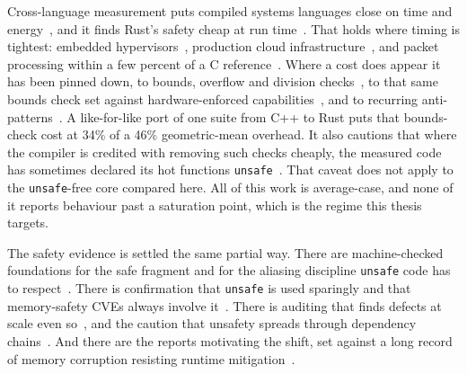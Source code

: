 \documentclass[english,oneside,a4paper,censored,csm,software-track-2020]{HYthesisML}
\begin{document}
Cross-language measurement puts compiled systems languages close on time and
energy~\cite{bugden2022rust,pereira2017energy}, and it finds Rust's safety cheap at run
time~\cite{balasubramanian2017rust,levy2017kernel}. That holds where timing is tightest: embedded
hypervisors~\cite{mo2023rustshyper}, production cloud infrastructure~\cite{agache2020firecracker},
and packet processing within a few percent of a C
reference~\cite{emmerich2019drivers,xiao2024rpkt}. Where a cost does appear it has been pinned
down, to bounds, overflow and division checks~\cite{zhang2022runtime}, to that same bounds check
set against hardware-enforced capabilities~\cite{harris2023morello}, and to recurring
anti-patterns~\cite{cui2025perfbugs}. A like-for-like port of one suite from C++ to Rust puts that
bounds-check cost at 34\% of a 46\% geometric-mean overhead. It also cautions that where the
compiler is credited with removing such checks cheaply, the measured code has sometimes declared
its hot functions \texttt{unsafe}~\cite{naylor2026cherisimt}. That caveat does not apply to the
\texttt{unsafe}-free core compared here. All of this work is average-case, and none of it reports
behaviour past a saturation point, which is the regime this thesis targets.

The safety evidence is settled the same partial way. There are machine-checked foundations for the
safe fragment and for the aliasing discipline \texttt{unsafe} code has to
respect~\cite{jung2018rustbelt,jung2021safe,jung2020stacked}. There is confirmation that
\texttt{unsafe} is used sparingly and that memory-safety CVEs always involve
it~\cite{qin2020rust,astrauskas2020unsafe,xu2021rustcve}. There is auditing that finds
defects at scale even so~\cite{bae2021rudra,zheng2024security,qin2024safety}, and the caution that
unsafety spreads through dependency chains~\cite{evans2020rust}. And there are the reports
motivating the shift, set against a long record of memory corruption resisting runtime
mitigation~\cite{msrc2019memory,google2022android,google2024securebydesign,cisa2023memorysafe,oncd2024building,szekeres2013sok}.
\end{document}

